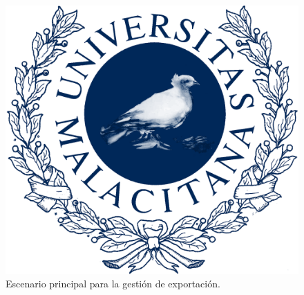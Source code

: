 \begin{figure}[H]
    \includegraphics[width=1\linewidth]{assets/umaLogo.png}
    \caption{Escenario principal para la gestión de exportación.}
\end{figure}
